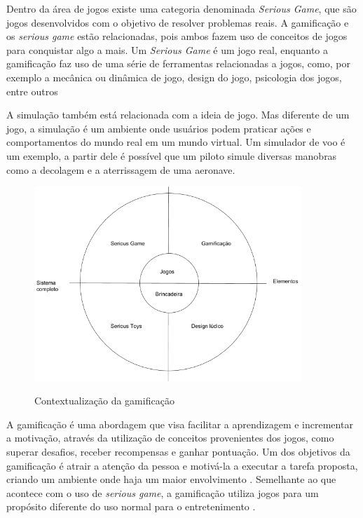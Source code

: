 \documentclass[
	12pt,				%
	oneside,			%
	a4paper,			%
	english,			%
	french,				%
	spanish,			%
	brazil,				%
	]{abntex2}
\begin{document}
Dentro da área de jogos existe uma categoria denominada \textit{Serious Game}, que são jogos desenvolvidos com o objetivo de resolver problemas reais. A gamificação e os \textit{serious game} estão relacionadas, pois ambos fazem uso de conceitos de jogos para conquistar algo a mais. Um \textit{Serious Game} é um jogo real, enquanto a gamificação faz uso de uma série de ferramentas relacionadas a jogos, como, por exemplo a mecânica ou dinâmica de jogo, design do jogo, psicologia dos jogos, entre outros \cite{dorling2012software}

A simulação também está relacionada com a ideia de jogo. Mas diferente de um jogo, a simulação é um ambiente onde usuários podem praticar ações e comportamentos do mundo real em um mundo virtual. Um simulador de voo é um exemplo, a partir dele é possível que um piloto simule diversas manobras como a decolagem e a aterrissagem de uma aeronave.

\begin{figure}[ht]
\centering
\caption{Contextualização da gamificação }
\includegraphics[width=0.9\textwidth]{imagens/gamificacao.png}
\label{fig:gamificacao}
\end{figure}

A gamificação é uma abordagem que visa facilitar a aprendizagem e incrementar a motivação, através da utilização de conceitos provenientes dos jogos, como superar desafios, receber recompensas e ganhar pontuação. Um dos objetivos da gamificação é atrair a atenção da pessoa e motivá-la a executar a tarefa proposta, criando um ambiente onde haja um maior envolvimento \cite{kaap:2014}. Semelhante ao que acontece com o uso de \textit{serious game}, a gamificação utiliza jogos para um propósito diferente do uso normal para o entretenimento \cite{deterding2011game}.
\end{document}

